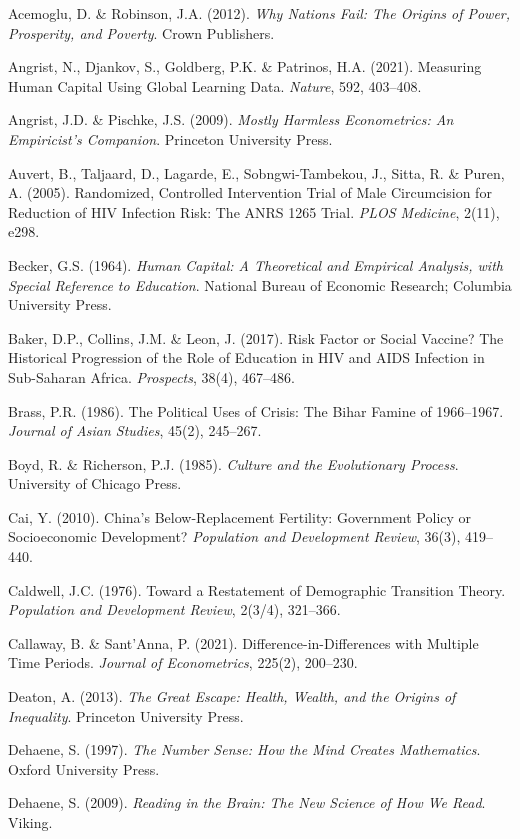 \documentclass[12pt,letterpaper]{article}
\begin{document}
Acemoglu, D. \& Robinson, J.A. (2012). \emph{Why Nations Fail: The
Origins of Power, Prosperity, and Poverty}. Crown Publishers.

Angrist, N., Djankov, S., Goldberg, P.K. \& Patrinos, H.A. (2021).
Measuring Human Capital Using Global Learning Data. \emph{Nature}, 592,
403--408.

Angrist, J.D. \& Pischke, J.S. (2009). \emph{Mostly Harmless
Econometrics: An Empiricist's Companion}. Princeton University Press.

Auvert, B., Taljaard, D., Lagarde, E., Sobngwi-Tambekou, J., Sitta, R.
\& Puren, A. (2005). Randomized, Controlled Intervention Trial of Male
Circumcision for Reduction of HIV Infection Risk: The ANRS 1265 Trial.
\emph{PLOS Medicine}, 2(11), e298.

Becker, G.S. (1964). \emph{Human Capital: A Theoretical and Empirical
Analysis, with Special Reference to Education}. National Bureau of
Economic Research; Columbia University Press.

Baker, D.P., Collins, J.M. \& Leon, J. (2017). Risk Factor or Social
Vaccine? The Historical Progression of the Role of Education in HIV and
AIDS Infection in Sub-Saharan Africa. \emph{Prospects}, 38(4), 467--486.

Brass, P.R. (1986). The Political Uses of Crisis: The Bihar Famine of
1966--1967. \emph{Journal of Asian Studies}, 45(2), 245--267.

Boyd, R. \& Richerson, P.J. (1985). \emph{Culture and the Evolutionary
Process}. University of Chicago Press.

Cai, Y. (2010). China's Below-Replacement Fertility: Government Policy
or Socioeconomic Development? \emph{Population and Development Review},
36(3), 419--440.

Caldwell, J.C. (1976). Toward a Restatement of Demographic Transition
Theory. \emph{Population and Development Review}, 2(3/4), 321--366.

Callaway, B. \& Sant'Anna, P. (2021). Difference-in-Differences with
Multiple Time Periods. \emph{Journal of Econometrics}, 225(2), 200--230.

Deaton, A. (2013). \emph{The Great Escape: Health, Wealth, and the
Origins of Inequality}. Princeton University Press.

Dehaene, S. (1997). \emph{The Number Sense: How the Mind Creates
Mathematics}. Oxford University Press.

Dehaene, S. (2009). \emph{Reading in the Brain: The New Science of
How We Read}. Viking.
\end{document}
